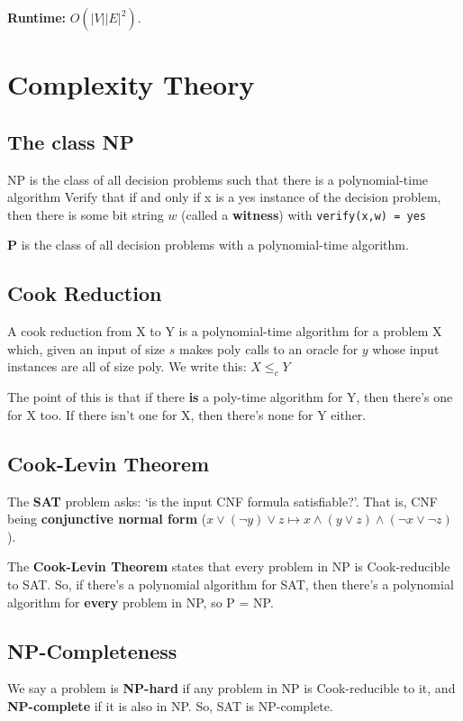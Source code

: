 \documentclass[11pt,fleqn,a4paper,titlepage,dvipsnames,cmyk]{scrartcl}
\begin{document}
\textbf{Runtime:} $O(|V||E|^2)$.

\section{Complexity Theory}%
\label{sec:Complexity Theory}
\subsection{The class NP}%
\label{sub:NP}
NP is the class of all decision problems such that there is a
polynomial-time algorithm Verify that if and only if x is a yes instance
of the decision problem, then there is some bit string $w$ (called a
\textbf{witness}) with \texttt{verify(x,w) = yes}

\textbf{P} is the class of all decision problems with a polynomial-time
algorithm.

\subsection{Cook Reduction}%
\label{sub:Cook Reduction}
A cook reduction from X to Y is a polynomial-time algorithm for a problem
X which, given an input of size $s$ makes poly calls to an oracle for $y$
whose input instances are all of size poly. We write this: $X \le_c Y$

The point of this is that if there \textbf{is} a poly-time algorithm for
Y, then there's one for X too. If there isn't one for X, then there's none
for Y either.

\subsection{Cook-Levin Theorem}%
\label{sub:Cook-Levin Theorem}
The \textbf{SAT} problem asks: `is the input CNF formula satisfiable?'.
That is, CNF being \textbf{conjunctive normal form} ($x \vee (\neg y) \vee
z \mapsto x \wedge (y \vee z) \wedge (\neg x \vee \neg z)$).

The \textbf{Cook-Levin Theorem} states that every problem in NP is
Cook-reducible to SAT. So, if there's a polynomial algorithm for SAT, then
there's a polynomial algorithm for \textbf{every} problem in NP, so P =
NP.

\subsection{NP-Completeness}%
\label{sub:NP-Completeness}
We say a problem is \textbf{NP-hard} if any problem in NP is
Cook-reducible to it, and \textbf{NP-complete} if it is also in NP. So,
SAT is NP-complete.
\end{document}
